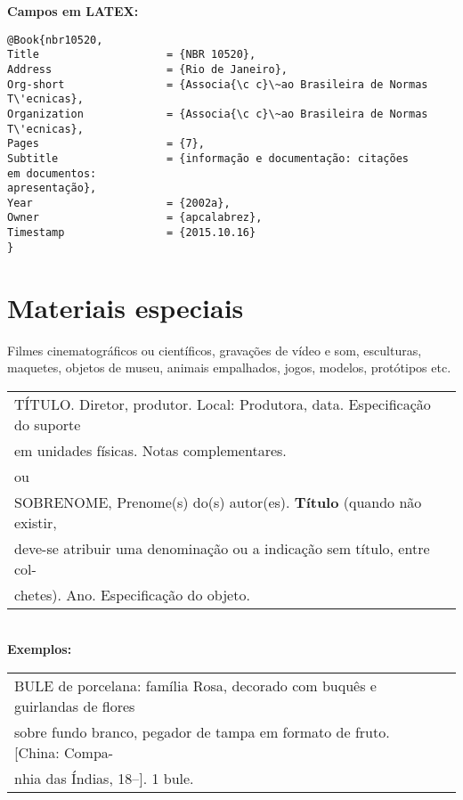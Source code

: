\textbf{Campos em LATEX:} 

\begin{verbatim}
@Book{nbr10520,
Title                    = {NBR 10520},
Address                  = {Rio de Janeiro},
Org-short                = {Associa{\c c}\~ao Brasileira de Normas 
T\'ecnicas},
Organization             = {Associa{\c c}\~ao Brasileira de Normas 
T\'ecnicas},
Pages                    = {7},
Subtitle                 = {informação e documentação: citações 
em documentos: 
apresentação},
Year                     = {2002a},
Owner                    = {apcalabrez},
Timestamp                = {2015.10.16}
}
\end{verbatim}


\section{Materiais especiais}

Filmes cinematogr\'aficos ou científicos, gravações de vídeo e som,
esculturas, maquetes, objetos de museu, animais empalhados, jogos,
modelos, protótipos etc. \\

\begin{tabular}{|l|c|} \hline
	TÍTULO. Diretor, produtor. Local: Produtora, data. Especificação do	suporte\\
	em unidades físicas. Notas complementares. \\
	
	ou\\	
	
	SOBRENOME, Prenome(s) do(s) autor(es). \textbf{Título} (quando não 	existir,\\
	deve-se atribuir uma denominação ou a indicação sem 	título, entre col-\\
	chetes). Ano. Especificação do objeto. 
	\\\hline
\end{tabular} \\

\textbf{Exemplos:} \\

\begin{tabular}{|l|c|} \hline
	BULE de porcelana: família Rosa, decorado com buqu\^es e guirlandas de flores\\ 
	sobre fundo branco, pegador de tampa em formato de fruto. [China: Compa-\\
	nhia das Índias, 18--]. 1 bule.  
	\\\hline
\end{tabular} \\

